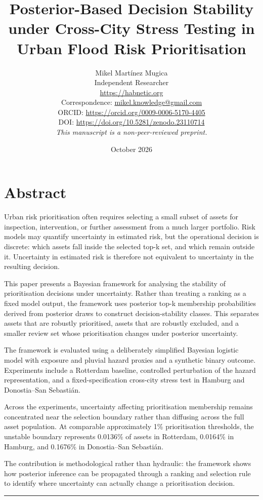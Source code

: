 \documentclass[
]{article}
\title{Posterior-Based Decision Stability under Cross-City Stress
Testing in Urban Flood Risk Prioritisation}
\author{\begin{tabular}{c}
Mikel Martínez Mugica \\
{\small Independent Researcher} \\
{\small \href{https://habnetic.org}{https://habnetic.org}} \\
{\small Correspondence: \href{mailto:mikel.knowledge@gmail.com}{mikel.knowledge@gmail.com}} \\
{\small ORCID: \href{https://orcid.org/0009-0006-5170-4405}{https://orcid.org/0009-0006-5170-4405}} \\
{\small DOI: \href{https://doi.org/10.5281/zenodo.23110714}{https://doi.org/10.5281/zenodo.23110714}} \\[0.7em]
{\small\itshape This manuscript is a non-peer-reviewed preprint.}
\end{tabular}}
\date{October 2026}
\begin{document}
\maketitle

{
\setcounter{tocdepth}{3}
\tableofcontents
}
\section{Abstract}\label{abstract}

Urban risk prioritisation often requires selecting a small subset of
assets for inspection, intervention, or further assessment from a much
larger portfolio. Risk models may quantify uncertainty in estimated
risk, but the operational decision is discrete: which assets fall inside
the selected top-k set, and which remain outside it. Uncertainty in
estimated risk is therefore not equivalent to uncertainty in the
resulting decision.

This paper presents a Bayesian framework for analysing the stability of
prioritisation decisions under uncertainty. Rather than treating a
ranking as a fixed model output, the framework uses posterior top-k
membership probabilities derived from posterior draws to construct
decision-stability classes. This separates assets that are robustly
prioritised, assets that are robustly excluded, and a smaller review set
whose prioritisation changes under posterior uncertainty.

The framework is evaluated using a deliberately simplified Bayesian
logistic model with exposure and pluvial hazard proxies and a synthetic
binary outcome. Experiments include a Rotterdam baseline, controlled
perturbation of the hazard representation, and a fixed-specification
cross-city stress test in Hamburg and Donostia--San Sebastián.

Across the experiments, uncertainty affecting prioritisation membership
remains concentrated near the selection boundary rather than diffusing
across the full asset population. At comparable approximately 1\%
prioritisation thresholds, the unstable boundary represents 0.0136\% of
assets in Rotterdam, 0.0164\% in Hamburg, and 0.1676\% in Donostia--San
Sebastián.

The contribution is methodological rather than hydraulic: the framework
shows how posterior inference can be propagated through a ranking and
selection rule to identify where uncertainty can actually change a
prioritisation decision.

\begin{center}\rule{0.5\linewidth}{0.5pt}\end{center}
\end{document}
